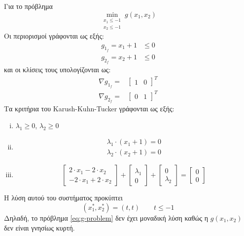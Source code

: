 Για το πρόβλημα
\begin{equation}
	\label{eq:g-problem}
	\min_{
		\substack{x_1 \leq -1 \\ x_2 \leq -1}
		}
	g(x_1, x_2)
\end{equation}
Οι περιορισμοί γράφονται ως εξής:
\begin{align*}
	g_{1_f} = x_1 + 1 &\leq 0\\
	g_{2_f} = x_2 + 1 &\leq 0
\end{align*}
και οι κλίσεις τους υπολογίζονται ως:
\begin{align*}
	\nabla g_{1_f} =& 
		\begin{bmatrix}
			1& 0
		\end{bmatrix}^T\\
	\nabla g_{2_f} =& 
		\begin{bmatrix}
			0& 1
		\end{bmatrix}^T
\end{align*}
Τα κριτήρια του Karush-Kuhn-Tucker γράφονται ως εξής:
\begin{enumerate}[i)]
	\item $\lambda_1 \geq 0$, $\lambda_2 \geq 0$
	\item \begin{align*}
			\lambda_1 \cdot (x_1 + 1) = 0\\
			\lambda_2 \cdot (x_2 + 1) = 0
		\end{align*}
	\item \begin{equation*}
		\begin{bmatrix}
			2 \cdot x_1 - 2 \cdot x_2\\
			-2 \cdot x_1 + 2 \cdot x_2
		\end{bmatrix} + 
		\begin{bmatrix}
			\lambda_1\\
			0
		\end{bmatrix} +
		\begin{bmatrix}
			0\\
			\lambda_2
		\end{bmatrix} = 
		\begin{bmatrix}
			0\\
			0
		\end{bmatrix}
	\end{equation*}
\end{enumerate}

Η λύση αυτού του συστήματος προκύπτει
\begin{equation}
	(x_1^*, x_2^*) = (t, t) \qquad t \leq -1
\end{equation}
Δηλαδή, το πρόβλημα \ref{eq:g-problem} δεν έχει μοναδική λύση καθώς η $g(x_1, x_2)$ δεν είναι γνησίως κυρτή.